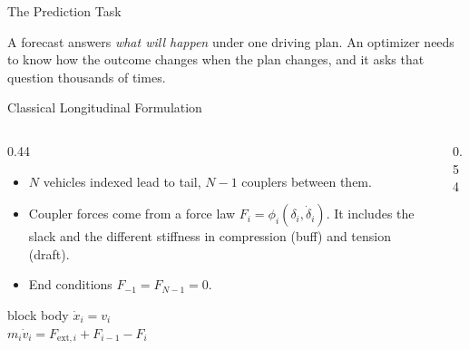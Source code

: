 %


\begin{frame}{The Prediction Task}
  \vspace{0.3em}
  \centering
  \scalebox{0.78}{\taskMap}

  \vspace{1.0em}
  \begin{minipage}{0.90\textwidth}\small
    A forecast answers \emph{what will happen} under one driving plan. An
    optimizer needs to know \alert{how the outcome changes when the plan
    changes}, and it asks that question thousands of times.
  \end{minipage}
\end{frame}

\begin{frame}{Classical Longitudinal Formulation}
  \vspace{0.2em}
  \begin{columns}[T,onlytextwidth]
    \begin{column}{0.44\textwidth}
      \begin{itemize}\setlength\itemsep{0.5em}
        \item $N$ vehicles indexed lead to tail, $N-1$ couplers between them.
        \item Coupler forces come from a force law
              $F_i = \phi_i(\delta_i, \dot\delta_i)$. It includes the slack and
              the different stiffness in compression (buff) and tension (draft).
        \item End conditions $F_{-1} = F_{N-1} = 0$.
      \end{itemize}
      \vspace{0.5em}
      \begin{beamercolorbox}[wd=0.96\linewidth,sep=6pt,center]{block body}
        $\dot x_i = v_i$ \\[0.35em]
        $m_i \dot v_i = F_{\mathrm{ext},i} + F_{i-1} - F_i$
      \end{beamercolorbox}
    \end{column}
    \begin{column}{0.54\textwidth}
      \centering
      \vspace{1.4em}
      \scalebox{0.70}{\trainFBD[1]}

      \vspace{1.2em}
    \end{column}
  \end{columns}
\end{frame}

